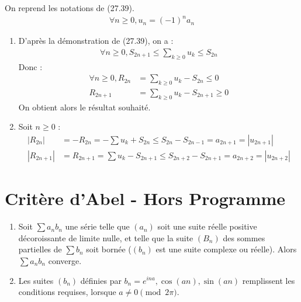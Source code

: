 \documentclass[../main.tex]{subfiles}
\begin{document}
\noindent On reprend les notations de (27.39). \\
\begin{align*}
    \forall n\geq 0, u_n = (-1)^n a_n
\end{align*}
\begin{enumerate}
    \item D'après la démonstration de (27.39), on a : 
    \begin{align*}
        \forall n\geq 0, S_{2n+1} \leq \sum_{k\geq 0} u_k \leq S_{2n}
    \end{align*}
    Donc :
    \begin{align*}
        \forall n\geq 0, R_{2n} &= \sum_{k\geq 0} u_k - S_{2n} \leq 0 \\
        R_{2n+1} &= \sum_{k\geq 0} u_k - S_{2n+1} \geq 0
    \end{align*}
    On obtient alors le résultat souhaité. 
    \item Soit $n\geq 0$ : 
    \begin{align*}
        |R_{2n}| &= -R_{2n} = -\sum u_k + S_{2n}  \leq S_{2n} - S_{2n-1} = a_{2n+1} = |u_{2n+1}| \\
        |R_{2n+1}| &= R_{2n+1} = \sum u_k - S_{2n+1} \leq S_{2n+2} - S_{2n+1} = a_{2n+2} = |u_{2n+2}|
    \end{align*}
\end{enumerate}

\section{Critère d'Abel - Hors Programme}
\begin{tcolorbox}[title=Théorème 27.44 - HP, title filled=false, colframe=orange, colback=orange!10!white]
    \begin{enumerate}
        \item Soit $\sum a_n b_n$ une série telle que $(a_n)$ soit une suite réelle positive décoroissante de limite nulle, et telle que la suite $(B_n)$ des sommes partielles de $\sum b_n$ soit bornée ($(b_n)$ est une suite complexe ou réelle). Alors $\sum a_n b_n$ converge.
        \item Les suites $(b_n)$ définies par $b_n = e^{ina}, \cos (an), \sin (an)$ remplissent les conditions requises, lorsque $a\neq 0\pmod{2\pi}$.
    \end{enumerate}
\end{tcolorbox}
\end{document}
